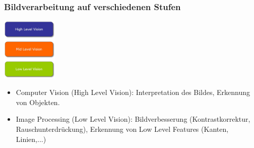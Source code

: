 \subsubsection{Bildverarbeitung auf verschiedenen Stufen}
\begin{center}
	\includegraphics[height=3cm,keepaspectratio]{images/sw01/StufenBildverarbeitung.JPG}
\end{center}

\begin{itemize}
	\itemsep0pt
	\item Computer Vision (High Level Vision): Interpretation des Bildes, Erkennung von Objekten. 
	\item Image Processing (Low Level Vision): Bildverbesserung (Kontrastkorrektur, Rauschunterdrückung), Erkennung von Low Level Features (Kanten, Linien,...)
\end{itemize}

